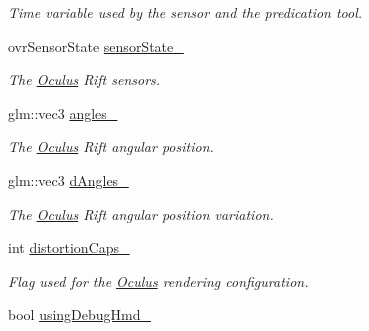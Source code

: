 \begin{DoxyCompactItemize}
\begin{DoxyCompactList}\small\item\em Time variable used by the sensor and the predication tool. \end{DoxyCompactList}\item 
\hypertarget{classOculus_a37a433aa3b8444d0a5438073a7d7b5b4}{}ovr\+Sensor\+State \hyperlink{classOculus_a37a433aa3b8444d0a5438073a7d7b5b4}{sensor\+State\+\_\+}\label{classOculus_a37a433aa3b8444d0a5438073a7d7b5b4}

\begin{DoxyCompactList}\small\item\em The \hyperlink{classOculus}{Oculus} Rift sensors. \end{DoxyCompactList}\item 
\hypertarget{classOculus_a99c5e2751f5e1aaf42d177b0d36ac62d}{}glm\+::vec3 \hyperlink{classOculus_a99c5e2751f5e1aaf42d177b0d36ac62d}{angles\+\_\+}\label{classOculus_a99c5e2751f5e1aaf42d177b0d36ac62d}

\begin{DoxyCompactList}\small\item\em The \hyperlink{classOculus}{Oculus} Rift angular position. \end{DoxyCompactList}\item 
\hypertarget{classOculus_a3065d87c9d010aaf83822c8414b680c4}{}glm\+::vec3 \hyperlink{classOculus_a3065d87c9d010aaf83822c8414b680c4}{d\+Angles\+\_\+}\label{classOculus_a3065d87c9d010aaf83822c8414b680c4}

\begin{DoxyCompactList}\small\item\em The \hyperlink{classOculus}{Oculus} Rift angular position variation. \end{DoxyCompactList}\item 
\hypertarget{classOculus_ae5ae5f7bf69f57f9d40a6792843fed87}{}int \hyperlink{classOculus_ae5ae5f7bf69f57f9d40a6792843fed87}{distortion\+Caps\+\_\+}\label{classOculus_ae5ae5f7bf69f57f9d40a6792843fed87}

\begin{DoxyCompactList}\small\item\em Flag used for the \hyperlink{classOculus}{Oculus} rendering configuration. \end{DoxyCompactList}\item 
\hypertarget{classOculus_aeef8b424f3fc4d181b18f01c15809e25}{}bool \hyperlink{classOculus_aeef8b424f3fc4d181b18f01c15809e25}{using\+Debug\+Hmd\+\_\+}\label{classOculus_aeef8b424f3fc4d181b18f01c15809e25}


\end{DoxyCompactItemize}
